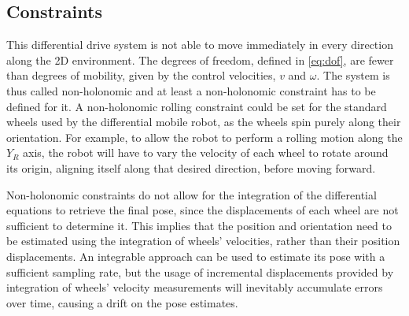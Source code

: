 \subsection{Constraints}
\label{sec:constraints}
\noindent
This differential drive system is not able to move immediately in every direction along the \gls{2D} environment.
The degrees of freedom, defined in \eqref{eq:dof}, are fewer than degrees of mobility, given by the control velocities, $v$ and $\omega$.
The system is thus called non-holonomic and at least a non-holonomic constraint has to be defined for it.
A non-holonomic rolling constraint could be set for the standard wheels used by the differential mobile robot, as the wheels spin purely along their orientation.
For example, to allow the robot to perform a rolling motion along the $Y_R$ axis, the robot will have to vary the velocity of each wheel to rotate around its origin, aligning itself along that desired direction, before moving forward.

Non-holonomic constraints do not allow for the integration of the differential equations to retrieve the final pose, since the displacements of each wheel are not sufficient to determine it.
This implies that the position and orientation need to be estimated using the integration of wheels' velocities, rather than their position displacements.
An integrable approach can be used to estimate its pose with a sufficient sampling rate, but the usage of incremental displacements provided by integration of wheels' velocity measurements will inevitably accumulate errors over time, causing a drift on the pose estimates.


